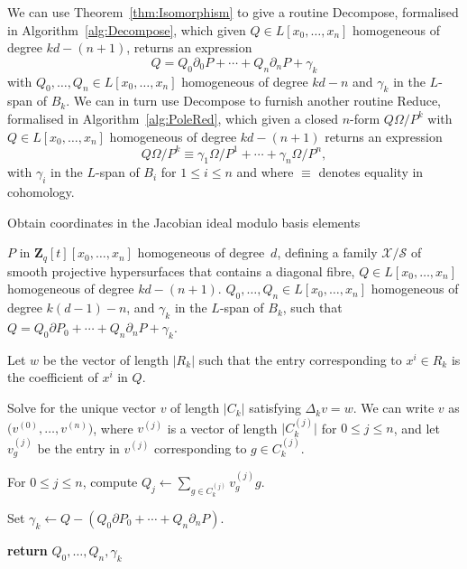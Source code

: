 \documentclass[a4paper,11pt]{article}
\numberwithin{equation}{section}
\providecommand{\abs}[1]{\lvert#1\rvert}                 %
\newcommand{\ZZ}{\mathbf{Z}} %
\theoremstyle{definition}
\begin{document}
We can use Theorem~\ref{thm:Isomorphism} to give a routine {\sc Decompose}, 
formalised in Algorithm~\ref{alg:Decompose}, which given 
$Q \in L[x_0, \dotsc, x_n]$ homogeneous of degree $kd - (n+1)$, 
returns an expression 
\begin{equation*}
Q = Q_0 \partial_0 P + \dotsb + Q_n \partial_n P + \gamma_k
\end{equation*} 
with $Q_0, \dotsc, Q_n \in L[x_0, \dotsc, x_n]$ homogeneous of 
degree $kd-n$ and $\gamma_k$ in the $L$-span of $B_k$. We can in turn 
use {\sc Decompose} to furnish another routine {\sc Reduce}, formalised 
in Algorithm~\ref{alg:PoleRed}, which given a closed $n$-form $Q\Omega/P^k$ 
with $Q \in L[x_0, \dotsc, x_n]$ homogeneous of degree $kd - (n+1)$ returns 
an expression
\begin{equation*}
Q \Omega / P^k \equiv \gamma_{1} \Omega / P^{1} + \dotsb + \gamma_n \Omega / P^n,
\end{equation*}
with $\gamma_i$ in the $L$-span of $B_i$ for $1 \leq i \leq n$ and 
where $\equiv$ denotes equality in cohomology.


\begin{algorithm}
\caption{Obtain coordinates in the Jacobian ideal modulo basis elements}
\label{alg:Decompose}
\begin{algorithmic}
\Require $P$ in $\ZZ_q[t][x_0, \dotsc, x_n]$ homogeneous of degree~$d$, 
         defining a family $\mathcal{X}/\mathcal{S}$ of smooth projective 
         hypersurfaces that contains a diagonal fibre, 
         $Q \in L[x_0, \dotsc, x_n]$ homogeneous of degree $kd - (n+1)$.
\Ensure  $Q_0, \dotsc, Q_n \in L[x_0, \dotsc, x_n]$ homogeneous of degree 
         $k(d-1)-n$, and $\gamma_k$ in the $L$-span of $B_k$, such that 
         $Q = Q_0 \partial P_0 + \dotsb + Q_n \partial_n P +\gamma_k$.
\State \begin{compactenum}[{\hspace{1em}} 1.] \vspace{-1.24em}
\item Let $w$ be the vector of length $\abs{R_k}$ such that the entry 
      corresponding to $x^i \in R_k$ is the coefficient of 
      $x^i$ in $Q$.
\item Solve for the unique vector $v$ of length $\abs{C_k}$ satisfying 
      $\Delta_k v = w$.  We can write $v$ 
      as $\bigl(v^{(0)}, \dotsc, v^{(n)}\bigr)$, where $v^{(j)}$ is 
      a vector of length $\abs{C_k^{(j)}}$ for $0 \leq j \leq n$,
      and let $v_g^{(j)}$ be the entry in $v^{(j)}$ corresponding 
      to $g \in C_k^{(j)}$.
\item For $0 \leq j \leq n$, compute $Q_j \gets \sum_{g \in C_k^{(j)}} v_g^{(j)} g$.
\item Set $\gamma_k \gets Q-(Q_0 \partial P_0 + \dotsb + Q_n \partial_n P)$.
\item \textbf{return} $Q_0, \dotsc, Q_n,\gamma_k$      
\EndProcedure
\end{compactenum}
\end{algorithmic}
\end{algorithm}
\end{document}
